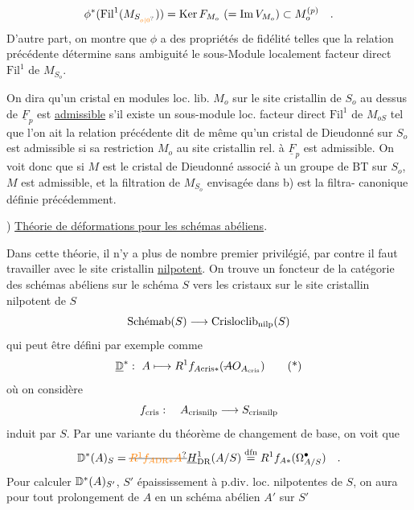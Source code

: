 \[
\phi^{\handwritten{*}}(\mathrm{Fil}^1(M_{S_{\unsure{o|0}}}))=
\operatorname{Ker} F_{M_o}\ (=\operatorname{Im}V_{M_o})\handwritten{\subset}M_o^{(p)}\quad .
\]
D'autre part, on montre que $\phi$ a des propriétés de fidélité telles que la relation précédente détermine sans ambiguité le sous-Module localement facteur direct $\mathrm{Fil}^1$ de $M_{S_o}$.

On dira qu'un cristal en modules loc. lib. $M_o$ sur le site cristallin de $S_o$ au dessus de $\underline{F}_p$ est \uline{admissible} s'il existe un sous-module loc.  facteur direct $\mathrm{Fil}^1$ de $M_{oS}$ tel que l'on ait la relation précédente\unsure{;|,}   dit de même qu'un cristal de Dieudonné  sur $S_o$ est admissible si sa restriction $M_o$  au site cristallin rel. à $\underline{F}_p$ est admissible. On voit donc que si $M$ est le cristal de Dieudonné associé à un groupe de BT sur $S_o$, $M$ est admissible, et la filtration de $M_{S_o}$ envisagée dans b) est la filtra- canonique définie précédemment.


) \uline{Théorie de déformations pour les schémas abéliens}.

 Dans cette théorie, il n'y a plus de nombre premier privilégié, par contre il faut travailler avec le site cristallin \uline{nilpotent}. On trouve un foncteur  de la catégorie des schémas abéliens sur le schéma $S$ vers les  cristaux sur le site cristallin nilpotent de $S$
\[
\text{Schémab}(S)\longrightarrow\mathrm{Crisloclib}_{\mathrm{nilp}}(S)
\]
qui peut être défini par exemple comme
\[
\underline{\handwritten{\mathbb{D}}}^{*}:\ A\handwritten{\longmapsto}R^1 f_{A\mathrm{cris}*}(\deleted{A}\handwritten{O_{A_{\mathrm{cris}}}})
\tag*{\handwritten{(*)}}
\]
où on considère
\[
f_{\mathrm{cris}}:\quad A_{\mathrm{crisnilp}}\longrightarrow S_{\mathrm{crisnilp}}
\]
induit par $S$. Par une variante du théorème de changement de base, on voit que
\[
\mathbb{D}^*(A)_S=\deleted{\unsure{R^1 f_{A\mathrm{DR}*} A}}\underline{H}_{\mathrm{DR}}^1(A/S)\overset{\mathrm{dfn}}{=}R^1 f_{A*}(\handwritten{\Omega}_{A/S}^{\bullet})\quad .
\]
Pour calculer $\mathbb{D}^{*}(A)_{S'}$, $S'$ épaississement à p.div. loc. nilpotentes de $S$, on aura pour tout prolongement  de $A$ en un schéma abélien $A'$ sur $S'$


